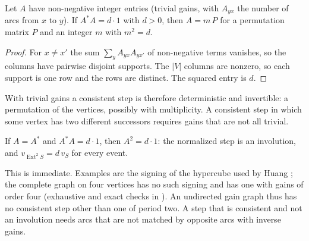 \begin{proposition}[No transport]\label{prop:perm}
Let $A$ have non-negative integer entries (trivial gains, with $A_{yx}$ the number of arcs from $x$ to $y$). If $A^*A=d\cdot1$ with $d>0$, then $A=m\,P$ for a permutation matrix $P$ and an integer $m$ with $m^2=d$.
\end{proposition}
\begin{proof}
For $x\ne x'$ the sum $\sum_yA_{yx}A_{yx'}$ of non-negative terms vanishes, so the columns have pairwise disjoint supports. The $|V|$ columns are nonzero, so each support is one row and the rows are distinct. The squared entry is $d$.
\end{proof}
With trivial gains a consistent step is therefore deterministic and invertible: a permutation of the vertices, possibly with multiplicity. A consistent step in which some vertex has two different successors requires gains that are not all trivial.

\begin{proposition}\label{prop:invol}
If $A=A^*$ and $A^*A=d\cdot1$, then $A^2=d\cdot1$: the normalized step is an involution, and $v_{\operatorname{Ext}^2S}=d\,v_S$ for every event.
\end{proposition}
This is immediate. Examples are the signing of the hypercube used by Huang \cite{huang,g8}; the complete graph on four vertices has no such signing and has one with gains of order four (exhaustive and exact checks in \cite{comp3}). An undirected gain graph thus has no consistent step other than one of period two. A step that is consistent and not an involution needs arcs that are not matched by opposite arcs with inverse gains.

